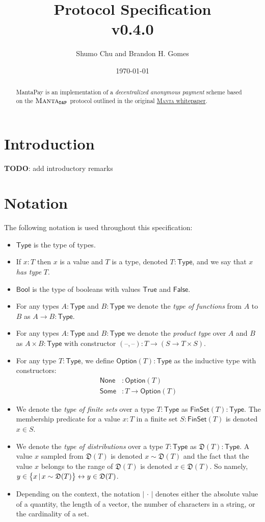 \documentclass[a4paper]{article}
\title{\textbf{\MantaPay{} Protocol Specification}\\ v0.4.0}
\author{Shumo Chu and Brandon H. Gomes}
\date{\today}
\newcommand{\lsection}[2]{\def\sectionlabel{#2} \section{#1}\label{sec:#2}}
\newcommand{\TODO}[1]{{\color{red}\textbf{TODO}}: #1}
\theoremstyle{definition}
\newcommand{\dash}{{\textrm{--}}}
\renewcommand{\abs}[1]{\left|#1\right|}
\newcommand{\Bool}{{\textsf{Bool}}}
\newcommand{\False}{{\textsf{False}}}
\newcommand{\FinSet}{{\textsf{FinSet}}}
\newcommand{\MantaDAP}{{\Manta{}_{\texttt{DAP}}}}
\newcommand{\MantaPay}{{\textsf{MantaPay}}}
\newcommand{\Manta}{{\textsc{Manta}}}
\newcommand{\None}{{\textsf{None}}}
\newcommand{\Option}{{\textsf{Option}}}
\newcommand{\Some}{{\textsf{Some}}}
\newcommand{\True}{{\textsf{True}}}
\newcommand{\Type}{{\textsf{Type}}}
\begin{document}
    
\maketitle

\begin{abstract}
    \MantaPay{} is an implementation of a \emph{decentralized anonymous payment} scheme based on the $\MantaDAP$ protocol outlined in the original \href{https://eprint.iacr.org/2021/743.pdf}{\Manta{} whitepaper}.
\end{abstract}
    
\tableofcontents

\lsection{Introduction}{introduction}

\TODO{add introductory remarks}

\lsection{Notation}{notation}

The following notation is used throughout this specification:

\begin{itemize}
    \item $\Type$ is the type of types\footnotemark{}.
    \item If $x : T$ then $x$ is a value and $T$ is a type, denoted $T : \Type$, and we say that $x$ \emph{has type} $T$.
    \item $\Bool$ is the type of booleans with values $\True$ and $\False$.
    \item For any types $A : \Type$ and $B : \Type$ we denote the \emph{type of functions} from $A$ to $B$ as $A \to B : \Type$.
    \item For any types $A : \Type$ and $B : \Type$ we denote the \emph{product type} over $A$ and $B$ as $A \times B : \Type$ with constructor $(\dash, \dash) : T \to (S \to T \times S)$.
    \item For any type $T : \Type$, we define $\Option(T) : \Type$ as the inductive type with constructors:
        \begin{align*}
            \None &: \Option(T) \\
            \Some &: T \to \Option(T)
        \end{align*}
    \item We denote the \emph{type of finite sets} over a type $T : \Type$ as $\FinSet(T) : \Type$. The membership predicate for a value $x : T$ in a finite set $S : \FinSet(T)$ is denoted $x \in S$.
    \item We denote the \emph{type of distributions} over a type $T : \Type$ as $\mathfrak{D}(T) : \Type$. A value $x$ sampled from $\mathfrak{D}(T)$ is denoted $x \sim \mathfrak{D}(T)$ and the fact that the value $x$ belongs to the range of $\mathfrak{D}(T)$ is denoted $x \in \mathfrak{D}(T)$. So namely, $y \in \set{x \,|\, x \sim \mathfrak{D}(T)} \leftrightarrow y \in \mathfrak{D}(T)$.
    \item Depending on the context, the notation $\abs{\,\cdot\,}$ denotes either the absolute value of a quantity, the length of a vector, the number of characters in a string, or the cardinality of a set.
\end{itemize}
\end{document}
